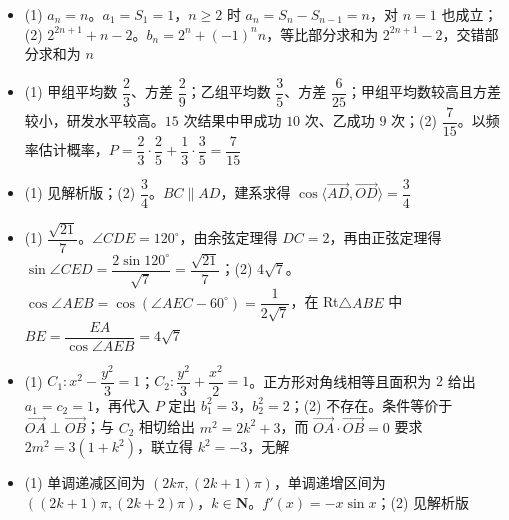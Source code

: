 \begin{itemize}[leftmargin=2.6em]
  \item[\textbf{16.}] (1) $a_n=n$。$a_1=S_1=1$，$n\geqslant2$ 时 $a_n=S_n-S_{n-1}=n$，对 $n=1$ 也成立；(2) $2^{2n+1}+n-2$。$b_n=2^n+(-1)^nn$，等比部分求和为 $2^{2n+1}-2$，交错部分求和为 $n$
  \item[\textbf{17.}] (1) 甲组平均数 $\dfrac23$、方差 $\dfrac29$；乙组平均数 $\dfrac35$、方差 $\dfrac6{25}$；甲组平均数较高且方差较小，研发水平较高。$15$ 次结果中甲成功 $10$ 次、乙成功 $9$ 次；(2) $\dfrac7{15}$。以频率估计概率，$P=\dfrac23\cdot\dfrac25+\dfrac13\cdot\dfrac35=\dfrac7{15}$
  \item[\textbf{18.}] (1) 见解析版；(2) $\dfrac34$。$BC\parallel AD$，建系求得 $\cos\langle\overrightarrow{AD},\overrightarrow{OD}\rangle=\dfrac34$
  \item[\textbf{19.}] (1) $\dfrac{\sqrt{21}}7$。$\angle CDE=120^\circ$，由余弦定理得 $DC=2$，再由正弦定理得 $\sin\angle CED=\dfrac{2\sin120^\circ}{\sqrt7}=\dfrac{\sqrt{21}}7$；(2) $4\sqrt7$。$\cos\angle AEB=\cos\left(\angle AEC-60^\circ\right)=\dfrac1{2\sqrt7}$，在 Rt$\triangle ABE$ 中 $BE=\dfrac{EA}{\cos\angle AEB}=4\sqrt7$
  \item[\textbf{20.}] (1) $C_1:x^2-\dfrac{y^2}3=1$；$C_2:\dfrac{y^2}3+\dfrac{x^2}2=1$。正方形对角线相等且面积为 $2$ 给出 $a_1=c_2=1$，再代入 $P$ 定出 $b_1^2=3$，$b_2^2=2$；(2) 不存在。条件等价于 $\overrightarrow{OA}\perp\overrightarrow{OB}$；与 $C_2$ 相切给出 $m^2=2k^2+3$，而 $\overrightarrow{OA}\cdot\overrightarrow{OB}=0$ 要求 $2m^2=3(1+k^2)$，联立得 $k^2=-3$，无解
  \item[\textbf{21.}] (1) 单调递减区间为 $(2k\pi,(2k+1)\pi)$，单调递增区间为 $((2k+1)\pi,(2k+2)\pi)$，$k\in\mathbf N$。$f'(x)=-x\sin x$；(2) 见解析版
\end{itemize}
